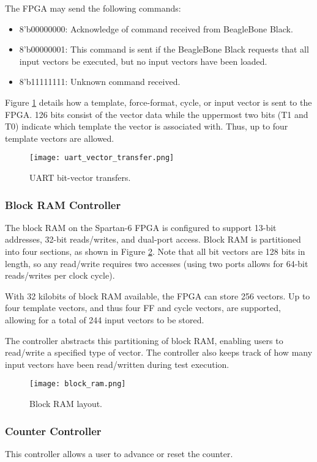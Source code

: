 The FPGA may send the following commands: 
\begin{itemize}
\item 8'b00000000: Acknowledge of command received from BeagleBone Black.
\item 8'b00000001: This command is sent if the BeagleBone Black requests that all input vectors be executed, but no input vectors have been loaded.
\item 8'b11111111: Unknown command received.
\end{itemize}

Figure \ref{fig:uart_vector_transfer} details  how a template, force-format, cycle, or input vector is sent to the FPGA. 126 bits consist of the vector data while the uppermost two bits (T1 and T0) indicate which template the vector is associated with. Thus, up to four template vectors are allowed.

\begin{figure}
\texttt{[image: uart\_vector\_transfer.png]}
\caption{UART bit-vector transfers.}
\label{fig:uart_vector_transfer}
\end{figure}

\subsubsection{Block RAM Controller}
The block RAM on the Spartan-6 FPGA is configured to support 13-bit addresses, 32-bit reads/writes, and dual-port access. Block RAM is partitioned into four sections, as shown in Figure \ref{fig:block_ram_layout}. Note that all bit vectors are 128 bits in length, so any read/write requires two accesses (using two ports allows for 64-bit reads/writes per clock cycle).

With 32 kilobits of block RAM available, the FPGA can store 256 vectors. Up to four template vectors, and thus four FF and cycle vectors, are supported, allowing for a total of 244 input vectors to be stored.

The controller abstracts this partitioning of block RAM, enabling users to read/write a specified type of vector. The controller also keeps track of how many input vectors have been read/written during test execution.

\begin{figure}
\texttt{[image: block\_ram.png]}
\caption{Block RAM layout.}
\label{fig:block_ram_layout}
\end{figure}

\subsubsection{Counter Controller}
This controller allows a user to advance or reset the counter.

